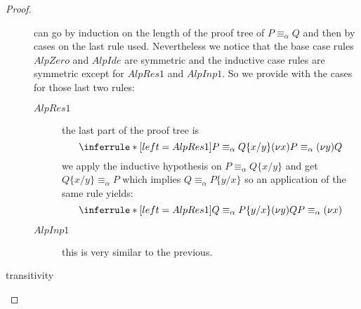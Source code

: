 \begin{lemma}
\begin{proof}
\begin{description}
\[	\]
	can go by induction on the length of the proof tree of $P\equiv_{\alpha}Q$ and then by cases on the last rule used. Nevertheless we notice that the base case rules $AlpZero$ and $AlpIde$ are symmetric and the inductive case rules are symmetric except for $AlpRes1$ and $AlpInp1$. So we provide with the cases for those last two rules:
	\begin{description}
	  \item[$AlpRes1$]
	    the last part of the proof tree is
	    \[\inferrule*[left=AlpRes1]{
		P\equiv_{\alpha}Q\{x/y\}
	    }{
	      (\nu x)P\equiv_{\alpha}(\nu y)Q
	    }\]
	    we apply the inductive hypothesis on $P\equiv_{\alpha}Q\{x/y\}$ and get $Q\{x/y\}\equiv_{\alpha}P$ which implies $Q\equiv_{\alpha}P\{y/x\}$ so an application of the same rule yields:
	    \[\inferrule*[left=AlpRes1]{
		Q\equiv_{\alpha}P\{y/x\}
	    }{
	      (\nu y)QP\equiv_{\alpha}(\nu x)
	    }\]
	  \item[$AlpInp1$]
	    this is very similar to the previous.
	\end{description}
      \item[transitivity]
	
    \end{description}
  \end{proof}
\end{lemma}




